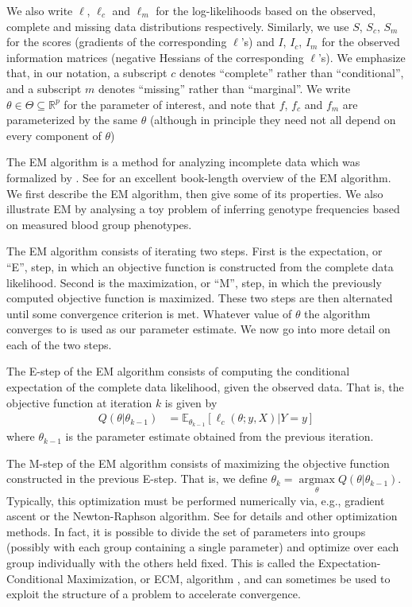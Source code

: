 \documentclass[11pt, oneside]{article}   	%
\newcommand{\bE}{\mathbb{E}}
\newcommand{\bR}{\mathbb{R}}
\DeclareMathOperator*{\argmax}{argmax}
\begin{document}
We also write $\ell$, $\ell_c$ and $\ell_m$ for the log-likelihoods based on the observed, complete and missing data distributions respectively. Similarly, we use $S$, $S_c$, $S_m$ for the scores (gradients of the corresponding $\ell$'s) and $I$, $I_c$, $I_m$ for the observed information matrices (negative Hessians of the corresponding $\ell$'s). We emphasize that, in our notation, a subscript $c$ denotes ``complete'' rather than ``conditional'', and a subscript $m$ denotes ``missing'' rather than ``marginal''. We write $\theta \in \Theta \subseteq \bR^p$ for the parameter of interest, and note that $f$, $f_c$ and $f_m$ are parameterized by the same $\theta$ (although in principle they need not all depend on every component of $\theta$)

The EM algorithm is a method for analyzing incomplete data which was formalized by \citet{Dem77}. See \citet{McL08} for an excellent book-length overview of the EM algorithm. We first describe the EM algorithm, then give some of its properties. We also illustrate EM by analysing a toy problem of inferring genotype frequencies based on measured blood group phenotypes.

The EM algorithm consists of iterating two steps. First is the expectation, or ``E'', step, in which an objective function is constructed from the complete data likelihood. Second is the maximization, or ``M'', step, in which the previously computed objective function is maximized. These two steps are then alternated until some convergence criterion is met. Whatever value of $\theta$ the algorithm converges to is used as our parameter estimate. We now go into more detail on each of the two steps.

The E-step of the EM algorithm consists of computing the conditional expectation of the complete data likelihood, given the observed data. That is, the objective function at iteration $k$ is given by
%
\begin{align}
    Q(\theta|\theta_{k-1}) & = \bE_{\theta_{k-1}}[\ell_c(\theta; y, X) | Y=y]
\end{align}
%
where $\theta_{k-1}$ is the parameter estimate obtained from the previous iteration. 

The M-step of the EM algorithm consists of maximizing the objective function constructed in the previous E-step. That is, we define $\theta_k = \argmax\limits_\theta Q(\theta|\theta_{k-1})$. Typically, this optimization must be performed numerically via, e.g., gradient ascent or the Newton-Raphson algorithm. See \citet{Noc06} for details and other optimization methods. In fact, it is possible to divide the set of parameters into groups (possibly with each group containing a single parameter) and optimize over each group individually with the others held fixed. This is called the Expectation-Conditional Maximization, or ECM, algorithm \citep{Men93}, and can sometimes be used to exploit the structure of a problem to accelerate convergence.
\end{document}

